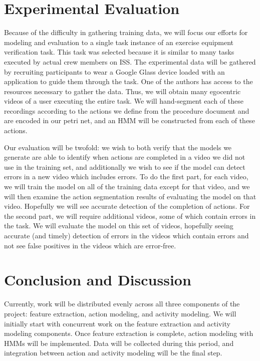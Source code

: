 \documentclass[10pt,letterpaper]{article}
\begin{document}
\section{Experimental Evaluation}
 
Because of the difficulty in gathering training data, we will focus our efforts for modeling and evaluation to a single task instance of an exercise equipment verification task. This task was selected because it is similar to many tasks executed by actual crew members on ISS. The experimental data will be gathered by recruiting participants to wear a Google Glass device loaded with an application to guide them through the task. One of the authors has access to the resources necessary to gather the data. Thus, we will obtain many egocentric videos of a user executing the entire task. We will hand-segment each of these recordings according to the actions we define from the procedure document and are encoded in our petri net, and an HMM will be constructed from each of these actions.

Our evaluation will be twofold: we wish to both verify that the models we generate are able to identify when actions are completed in a video we did not use in the training set, and additionally we wish to see if the model can detect errors in a new video which includes errors. To do the first part, for each video, we will train the model on all of the training data except for that video, and we will then examine the action segmentation results of evaluating the model on that video. Hopefully we will see accurate detection of the completion of actions. For the second part, we will require additional videos, some of which contain errors in the task. We will evaluate the model on this set of videos, hopefully seeing accurate (and timely) detection of errors in the videos which contain errors and not see false positives in the videos which are error-free.
 
\section{Conclusion and Discussion}

Currently, work will be distributed evenly across all three components of the project: feature extraction, action modeling, and activity modeling. We will initially start with concurrent work on the feature extraction and activity modeling components. Once feature extraction is complete, action modeling with HMMs will be implemented. Data will be collected during this period, and integration between action and activity modeling will be the final step.

\clearpage

{\small


}
\end{document}
